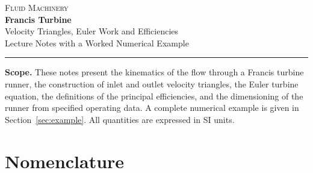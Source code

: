 \documentclass[11pt,a4paper]{article}
\numberwithin{equation}{section}
\begin{document}
\begin{center}
{\large\scshape Fluid Machinery}\\[0.6em]
{\LARGE\bfseries Francis Turbine}\\[0.4em]
{\Large Velocity Triangles, Euler Work and Efficiencies}\\[0.4em]
{\normalsize Lecture Notes with a Worked Numerical Example}
\end{center}
\vspace{0.2em}
\hrule
\vspace{0.8em}

\textbf{Scope.} These notes present the kinematics of the flow through a Francis turbine runner, the construction of inlet and outlet velocity triangles, the Euler turbine equation, the definitions of the principal efficiencies, and the dimensioning of the runner from specified operating data. A complete numerical example is given in Section~\ref{sec:example}. All quantities are expressed in SI units.

\tableofcontents

\section{Nomenclature}
\label{sec:nomenclature}
\end{document}
